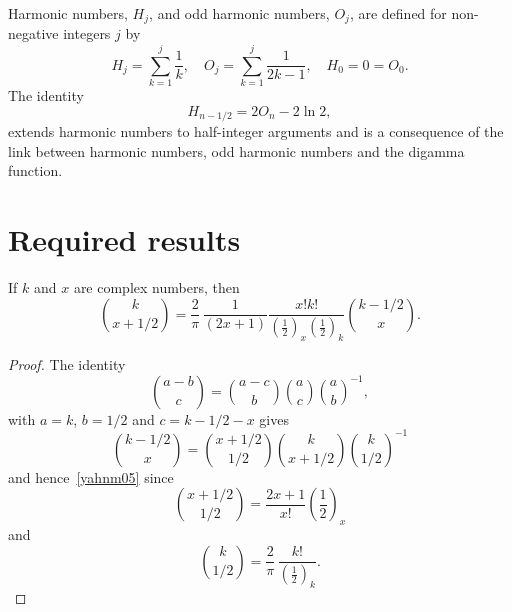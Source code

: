 \documentclass[12pt,reqno]{article}
\begin{document}
Harmonic numbers, $H_j$, and odd harmonic numbers, $O_j$, are defined for non-negative integers $j$ by
\begin{equation}
H_j=\sum_{k=1}^j\frac1k,\quad O_j=\sum_{k=1}^j\frac1{2k-1},\quad H_0=0=O_0.
\end{equation}
The identity
\begin{equation}\label{nerd5x1}
H_{n-1/2}=2O_n-2\ln 2,
\end{equation}
extends harmonic numbers to half-integer arguments and is a consequence of the link between harmonic numbers, odd harmonic numbers and the digamma function.

\section{Required results}
\begin{lemma}
If $k$ and $x$ are complex numbers, then
\begin{equation}\label{yahnm05}
\binom{{k}}{{x + 1/2}} = \frac{2}{\pi }\,\frac{1}{{\left( {2x + 1} \right)}}\frac{{x!k!}}{{\left( {\frac{1}{2}} \right)_x \left( {\frac{1}{2}} \right)_k }}\binom{{k - 1/2}}{x}.
\end{equation}
\end{lemma}
\begin{proof}
The identity
\begin{equation}\label{w7han3w}
\binom{{a - b}}{c} = \binom{{a - c}}{b}\binom{{a}}{c}\binom{{a}}{b}^{ - 1} ,
\end{equation}
with $a=k$, $b=1/2$ and $c=k-1/2-x$ gives
\begin{equation}
\binom{{k - 1/2}}{x} = \binom{{x + 1/2}}{{1/2}}\binom{{k}}{{x + 1/2}}\binom{{k}}{{1/2}}^{ - 1} 
\end{equation}
and hence~\eqref{yahnm05} since
\begin{equation}
\binom{{x + 1/2}}{{1/2}} = \frac{{2x + 1}}{{x!}}\left( {\frac{1}{2}} \right)_x 
\end{equation}
and
\begin{equation}
\binom{{k}}{{1/2}} = \frac{2}{\pi }\,\frac{{k!}}{{\left( {\frac{1}{2}} \right)_k }}.
\end{equation}
\end{proof}
\end{document}
